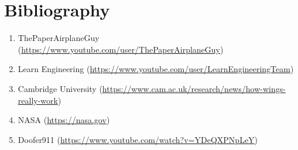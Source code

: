 \documentclass[12pt]{article}
\begin{document}
\section{Bibliography}
\begin{enumerate}
\item ThePaperAirplaneGuy (\url{https://www.youtube.com/user/ThePaperAirplaneGuy})
\item Learn Engineering (\url{https://www.youtube.com/user/LearnEngineeringTeam})
\item Cambridge University (\url{https://www.cam.ac.uk/research/news/how-wings-really-work})
\item NASA (\url{https://nasa.gov})
\item Doofer911 (\url{https://www.youtube.com/watch?v=YDeQXPNpLeY})
\end{enumerate}
\end{document}
